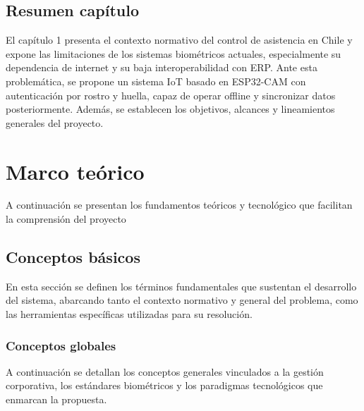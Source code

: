 \documentclass{iccmemoria}
\begin{document}
\section{Resumen capítulo}
El capítulo 1 presenta el contexto normativo del control de asistencia en Chile y expone las limitaciones de los sistemas biométricos actuales, especialmente su dependencia de internet y su baja interoperabilidad con ERP. Ante esta problemática, se propone un sistema IoT basado en ESP32-CAM con autenticación por rostro y huella, capaz de operar offline y sincronizar datos posteriormente. Además, se establecen los objetivos, alcances y lineamientos generales del proyecto.

\chapter{Marco teórico}
A continuación se presentan los fundamentos teóricos y tecnológico que facilitan la comprensión del proyecto
\section{Conceptos básicos}
En esta sección se definen los términos fundamentales que sustentan el desarrollo del sistema, abarcando tanto el contexto normativo y general del problema, como las herramientas específicas utilizadas para su resolución.
\subsection{Conceptos globales}
A continuación se detallan los conceptos generales vinculados a la gestión corporativa, los estándares biométricos y los paradigmas tecnológicos que enmarcan la propuesta.
\end{document}
